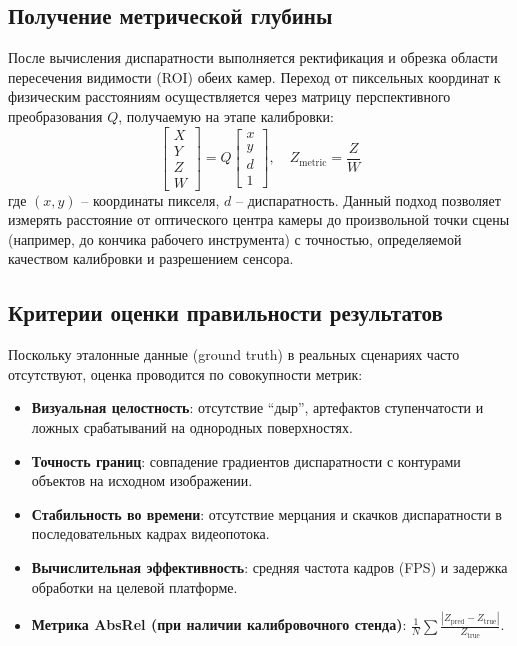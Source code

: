 	\subsection{Получение метрической глубины}
	После вычисления диспаратности выполняется ректификация и обрезка области пересечения видимости (ROI) обеих камер. Переход от пиксельных координат к физическим расстояниям осуществляется через матрицу перспективного преобразования $Q$, получаемую на этапе калибровки:
	\[
	\begin{bmatrix} X \\ Y \\ Z \\ W \end{bmatrix} = Q \begin{bmatrix} x \\ y \\ d \\ 1 \end{bmatrix}, \quad Z_{\text{metric}} = \frac{Z}{W}
	\]
	где $(x,y)$ -- координаты пикселя, $d$ -- диспаратность. Данный подход позволяет измерять расстояние от оптического центра камеры до произвольной точки сцены (например, до кончика рабочего инструмента) с точностью, определяемой качеством калибровки и разрешением сенсора.
	
	\subsection{Критерии оценки правильности результатов}
	Поскольку эталонные данные (ground truth) в реальных сценариях часто отсутствуют, оценка проводится по совокупности метрик:
	\begin{itemize}
		\item \textbf{Визуальная целостность}: отсутствие ``дыр'', артефактов ступенчатости и ложных срабатываний на однородных поверхностях.
		\item \textbf{Точность границ}: совпадение градиентов диспаратности с контурами объектов на исходном изображении.
		\item \textbf{Стабильность во времени}: отсутствие мерцания и скачков диспаратности в последовательных кадрах видеопотока.
		\item \textbf{Вычислительная эффективность}: средняя частота кадров (FPS) и задержка обработки на целевой платформе.
		\item \textbf{Метрика AbsRel (при наличии калибровочного стенда)}: $\frac{1}{N}\sum \frac{|Z_{\text{pred}} - Z_{\text{true}}|}{Z_{\text{true}}}$.
	\end{itemize}
	
